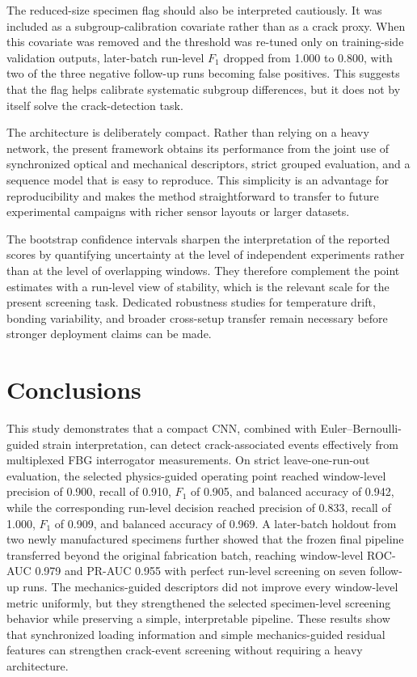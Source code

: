 \documentclass[notspecified,article,submit,pdftex,moreauthors]{Definitions/mdpi}
\newcommand{\rev}[1]{{\color{red}#1}}
\begin{document}
\rev{The reduced-size specimen flag should also be interpreted cautiously. It was included as a subgroup-calibration covariate rather than as a crack proxy. When this covariate was removed and the threshold was re-tuned only on training-side validation outputs, later-batch run-level $F_1$ dropped from 1.000 to 0.800, with two of the three negative follow-up runs becoming false positives. This suggests that the flag helps calibrate systematic subgroup differences, but it does not by itself solve the crack-detection task.}

The architecture is deliberately compact. Rather than relying on a heavy network, the present framework obtains its performance from the joint use of synchronized optical and mechanical descriptors, strict grouped evaluation, and a sequence model that is easy to reproduce. This simplicity is an advantage for reproducibility and makes the method straightforward to transfer to future experimental campaigns with richer sensor layouts or larger datasets.

The bootstrap confidence intervals sharpen the interpretation of the reported scores by quantifying uncertainty at the level of independent experiments rather than at the level of overlapping windows. They therefore complement the point estimates with a run-level view of stability, which is the relevant scale for the present screening task. \rev{Dedicated robustness studies for temperature drift, bonding variability, and broader cross-setup transfer remain necessary before stronger deployment claims can be made.}

\section{Conclusions}

This study demonstrates that a compact CNN, combined with Euler--Bernoulli-guided strain interpretation, can detect crack-associated events effectively from multiplexed FBG interrogator measurements. On strict leave-one-run-out evaluation, the selected physics-guided operating point reached window-level precision of 0.900, recall of 0.910, $F_1$ of 0.905, and balanced accuracy of 0.942, while the corresponding run-level decision reached precision of 0.833, recall of 1.000, $F_1$ of 0.909, and balanced accuracy of 0.969. \rev{A later-batch holdout from two newly manufactured specimens further showed that the frozen final pipeline transferred beyond the original fabrication batch, reaching window-level ROC-AUC 0.979 and PR-AUC 0.955 with perfect run-level screening on seven follow-up runs.} \rev{The mechanics-guided descriptors did not improve every window-level metric uniformly, but they strengthened the selected specimen-level screening behavior while preserving a simple, interpretable pipeline.} These results show that synchronized loading information and simple mechanics-guided residual features can strengthen crack-event screening without requiring a heavy architecture.
\end{document}

